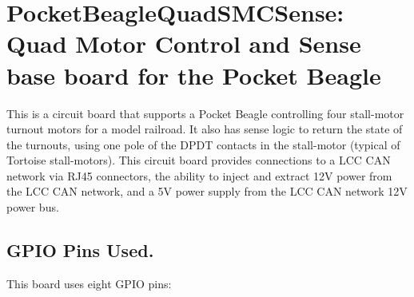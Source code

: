 %
%
%
%
% 
%
%
%
%
%
% 
%

\chapter{PocketBeagleQuadSMCSense: Quad Motor Control and Sense base board for the Pocket Beagle}

This is a circuit board that supports a Pocket Beagle controlling four 
stall-motor turnout motors for a model railroad. It also has sense logic to 
return the state of the turnouts, using one pole of the DPDT contacts in the 
stall-motor (typical of Tortoise stall-motors). This circuit board provides 
connections to a LCC CAN network via RJ45 connectors, the ability to inject 
and extract 12V power from the LCC CAN network, and a 5V power supply from the 
LCC CAN network 12V power bus.

\section{GPIO Pins Used.}

This board uses eight GPIO pins:

